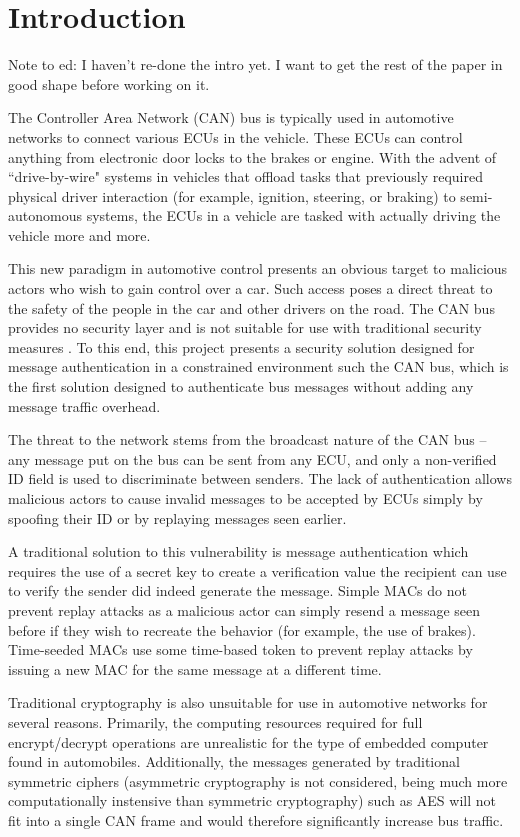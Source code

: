 \section{Introduction}
Note to ed: I haven't re-done the intro yet. I want to get the rest of the paper in good shape before working on it.

The Controller Area Network (CAN) bus is typically used in automotive networks to connect various ECUs in the vehicle. These ECUs can control anything from electronic door locks to the brakes or engine. With the advent of ``drive-by-wire" systems in vehicles that offload tasks that previously required physical driver interaction (for example, ignition, steering, or braking) to semi-autonomous systems, the ECUs in a vehicle are tasked with actually driving the vehicle more and more.

This new paradigm in automotive control presents an obvious target to malicious actors who wish to gain control over a car. Such access poses a direct threat to the safety of the people in the car and other drivers on the road. The CAN bus provides no security layer and is not suitable for use with traditional security measures \cite{Koscher-2010}\cite{Checkoway-2011}. To this end, this project presents a security solution designed for message authentication in a constrained environment such the CAN bus, which is the first solution designed to authenticate bus messages without adding any message traffic overhead. 

The threat to the network stems from the broadcast nature of the CAN bus -- any message put on the bus can be sent from any ECU, and only a non-verified ID field is used to discriminate between senders. The lack of authentication allows malicious actors to cause invalid messages to be accepted by ECUs simply by spoofing their ID or by replaying messages seen earlier.

A traditional solution to this vulnerability is message authentication which requires the use of a secret key to create a verification value the recipient can use to verify the sender did indeed generate the message. Simple MACs do not prevent replay attacks as a malicious actor can simply resend a message seen before if they wish to recreate the behavior (for example, the use of brakes). Time-seeded MACs use some time-based token to prevent replay attacks by issuing a new MAC for the same message at a different time.

Traditional cryptography is also unsuitable for use in automotive networks for several reasons. Primarily, the computing resources required for full encrypt/decrypt operations are unrealistic for the type of embedded computer found in automobiles. Additionally, the messages generated by traditional symmetric ciphers (asymmetric cryptography is not considered, being much more computationally instensive than symmetric cryptography) such as AES will not fit into a single CAN frame and would therefore significantly increase bus traffic.

